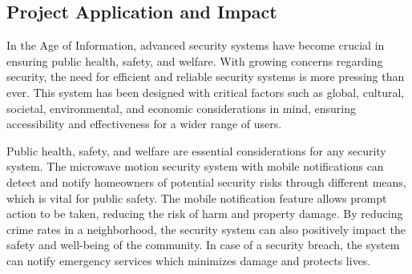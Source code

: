 \subsection{Project Application and Impact}\label{subsec:project-application-and-impact}

In the Age of Information, advanced security systems have become crucial in ensuring public
health, safety, and welfare. With growing concerns regarding security, the need for
efficient and reliable security systems is more pressing than ever. This system has been designed
with critical factors such as global, cultural, societal, environmental, and economic
considerations in mind, ensuring accessibility and effectiveness for a wider range of users.

Public health, safety, and welfare are essential considerations for any security system.
The microwave motion security system with mobile notifications can detect and notify homeowners
of potential security risks through different means, which is vital for public safety.
The mobile notification feature allows prompt action to be taken, reducing the risk of
harm and property damage. By reducing crime rates in a neighborhood, the security system
can also positively impact the safety and well-being of the community. In case of a
security breach, the system can notify emergency services which minimizes damage and protects lives.
